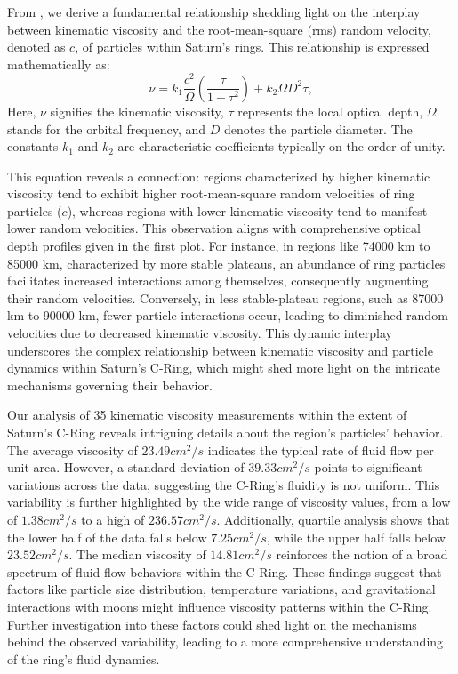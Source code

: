 \documentclass{article}
\begin{document}
From \cite{araki1986dynamics, Dougherty2009SaturnFC, 1988AJ.....95..925W}, we derive a fundamental relationship shedding light on the interplay between kinematic viscosity and the root-mean-square (rms) random velocity, denoted as $c$, of particles within Saturn's rings. This relationship is expressed mathematically as:
\begin{equation}
    \nu = k_{1}\frac{c^{2}}{\Omega}\left(\frac{\tau}{1+\tau^{2}}\right) + k_{2}\Omega D^{2}\tau,
\end{equation}
Here, $\nu$ signifies the kinematic viscosity, $\tau$ represents the local optical depth, $\Omega$ stands for the orbital frequency, and $D$ denotes the particle diameter. The constants $k_{1}$ and $k_{2}$ are characteristic coefficients typically on the order of unity.

This equation reveals a connection: regions characterized by higher kinematic viscosity tend to exhibit higher root-mean-square random velocities of ring particles ($c$), whereas regions with lower kinematic viscosity tend to manifest lower random velocities. This observation aligns with comprehensive optical depth profiles given in the first plot. For instance, in regions like 74000 km to 85000 km, characterized by more stable plateaus, an abundance of ring particles facilitates increased interactions among themselves, consequently augmenting their random velocities. Conversely, in less stable-plateau regions, such as 87000 km to 90000 km, fewer particle interactions occur, leading to diminished random velocities due to decreased kinematic viscosity. This dynamic interplay underscores the complex relationship between kinematic viscosity and particle dynamics within Saturn's C-Ring, which might shed more light on the intricate mechanisms governing their behavior.

Our analysis of 35 kinematic viscosity measurements within the extent of Saturn's C-Ring reveals intriguing details about the region's particles' behavior. The average viscosity of $23.49cm^{2}/s$ indicates the typical rate of fluid flow per unit area. However, a standard deviation of $39.33cm^{2}/s$ points to significant variations across the data, suggesting the C-Ring's fluidity is not uniform. This variability is further highlighted by the wide range of viscosity values, from a low of $1.38cm^{2}/s$ to a high of $236.57cm^{2}/s$. Additionally, quartile analysis shows that the lower half of the data falls below $7.25cm^{2}/s$, while the upper half falls below $23.52cm^{2}/s$. The median viscosity of $14.81cm^{2}/s$ reinforces the notion of a broad spectrum of fluid flow behaviors within the C-Ring. These findings suggest that factors like particle size distribution, temperature variations, and gravitational interactions with moons might influence viscosity patterns within the C-Ring. Further investigation into these factors could shed light on the mechanisms behind the observed variability, leading to a more comprehensive understanding of the ring's fluid dynamics.
\end{document}
